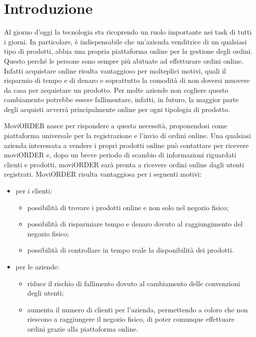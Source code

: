 
\chapter{Introduzione}
\label{cap:introduzione}

Al giorno d'oggi la tecnologia sta ricoprendo un ruolo importante nei task di tutti i giorni. In particolare, è indispensabile che un'azienda venditrice di un qualsiasi tipo di prodotti, abbia una propria piattaforma online per la gestione degli ordini. Questo perché le persone sono sempre più abituate ad effetturare ordini online. Infatti acquistare online risulta vantaggioso per molteplici motivi, quali il risparmio di tempo e di denaro e soprattutto la comodità di non doversi muovere da casa per acquistare un prodotto. Per molte aziende non cogliere questo cambiamento potrebbe essere fallimentare, infatti, in futuro, la maggior parte degli acquisti avverrà principalmente online per ogni tipologia di prodotto.

MoviORDER nasce per rispondere a questa necessità, proponendosi come piattaforma universale per la registrazione e l'invio di ordini online. Una qualsiasi azienda interessata a vendere i propri prodotti online può contattare \visione{} per ricevere moviORDER e, dopo un breve periodo di scambio di informazioni riguardati clienti e prodotti, moviORDER sarà pronta a ricevere ordini online dagli utenti registrati. 
MoviORDER risulta vantaggiosa per i seguenti motivi:
\begin{itemize}
	\item per i clienti:
	\begin{itemize}
		\item possibilità di trovare i prodotti online e non solo nel negozio fisico;
		\item possibilità di risparmiare tempo e denaro dovuto al raggiungimento del negozio fisico;
		\item possibilità di controllare in tempo reale la disponibilità dei prodotti.
	\end{itemize}
	\item per le aziende:
	\begin{itemize}
		\item riduce il rischio di fallimento dovuto al cambiamento delle convenzioni degli utenti;
		\item aumenta il numero di clienti per l'azienda, permettendo a coloro che non riescono a raggiungere il negozio fisico, di poter comunque effettuare ordini grazie alla piattaforma online.
	\end{itemize}
\end{itemize}

